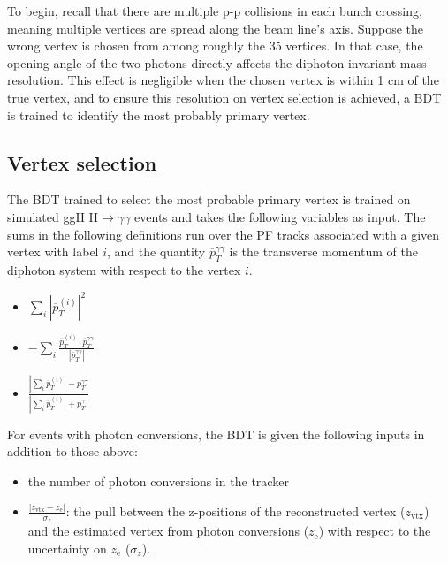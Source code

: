To begin, recall that there are multiple p-p collisions in each bunch crossing, meaning multiple vertices are spread along the beam line's axis. Suppose the wrong vertex is chosen from among roughly the 35 vertices. In that case, the opening angle of the two photons directly affects the diphoton invariant mass resolution. This effect is negligible when the chosen vertex is within 1 cm of the true vertex, and to ensure this resolution on vertex selection is achieved, a BDT is trained to identify the most probably primary vertex.

\subsection{Vertex selection}
\label{sec:vertex_selection}

The BDT trained to select the most probable primary vertex is trained on simulated ggH H$\rightarrow\gamma\gamma$ events and takes the following variables as input. The sums in the following definitions run over the PF tracks associated with a given vertex with label $i$, and the quantity $\overline{p}_T^{\gamma\gamma}$ is the transverse momentum of the diphoton system with respect to the vertex $i$.

\begin{itemize}
    \item $\sum_i |\overline{p}_T^{(i)}|^2$
    \item $-\sum_i \frac{\overline{p}_T^{(i)} \cdot \overline{p}_T^{\gamma\gamma}}{|\overline{p}_T^{\gamma\gamma}|}$
    \item $\frac{|\sum_i \overline{p}_T^{(i)}| - p_T^{\gamma\gamma}}{|\sum_i \overline{p}_T^{(i)}| + p_T^{\gamma\gamma}}$
\end{itemize}

For events with photon conversions, the BDT is given the following inputs in addition to those above:

\begin{itemize}
    \item the number of photon conversions in the tracker
    \item $\frac{|z_{\mathrm{vtx}} - z_{\mathrm{e}}|}{\sigma_z}$: the pull between the z-positions of the reconstructed vertex ($z_{\mathrm{vtx}}$) and the estimated vertex from photon conversions ($z_{\mathrm{e}}$) with respect to the uncertainty on $z_{\mathrm{e}}$ ($\sigma_z$).
\end{itemize}

